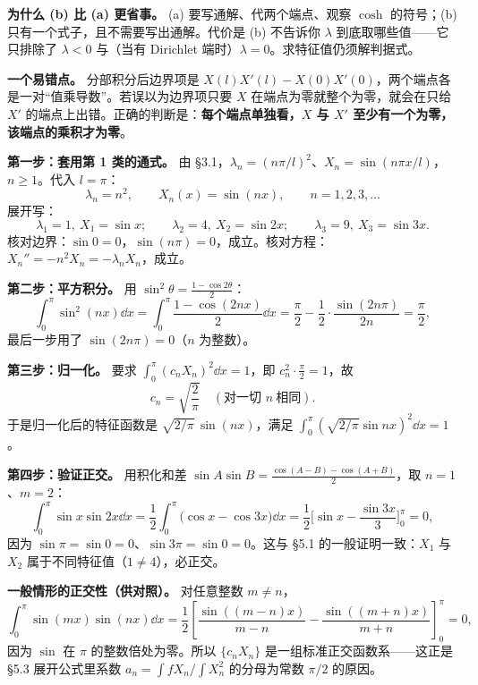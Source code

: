 \documentclass[11pt]{ctexart}
\begin{document}
\textbf{为什么 (b) 比 (a) 更省事。} (a) 要写通解、代两个端点、观察 $\cosh$ 的符号；(b) 只有一个式子，且不需要写出通解。代价是 (b) 不告诉你 $\lambda$ 到底取哪些值——它只排除了 $\lambda<0$ 与（当有 Dirichlet 端时）$\lambda=0$。求特征值仍须解判据式。

\textbf{一个易错点。} 分部积分后边界项是 $X(l)X'(l)-X(0)X'(0)$，两个端点各是一对“值乘导数”。若误以为边界项只要 $X$ 在端点为零就整个为零，就会在只给 $X'$ 的端点上出错。正确的判断是：\textbf{每个端点单独看，$X$ 与 $X'$ 至少有一个为零，该端点的乘积才为零}。



\textbf{第一步：套用第 1 类的通式。} 由 §3.1，$\lambda_n=(n\pi/l)^2$、$X_n=\sin(n\pi x/l)$，$n\ge1$。代入 $l=\pi$：
\[
\lambda_n=n^2,\qquad X_n(x)=\sin(nx),\qquad n=1,2,3,\dots
\]
展开写：
\[
\lambda_1=1,\ X_1=\sin x;\qquad
\lambda_2=4,\ X_2=\sin2x;\qquad
\lambda_3=9,\ X_3=\sin3x .
\]
核对边界：$\sin0=0$，$\sin(n\pi)=0$，成立。核对方程：$X_n''=-n^2X_n=-\lambda_nX_n$，成立。

\textbf{第二步：平方积分。} 用 $\sin^2\theta=\frac{1-\cos2\theta}{2}$：
\[
\int_0^\pi\sin^2(nx)\dd x=\int_0^\pi\frac{1-\cos(2nx)}{2}\dd x=\frac{\pi}{2}-\frac{1}{2}\cdot\frac{\sin(2n\pi)}{2n}=\frac{\pi}{2},
\]
最后一步用了 $\sin(2n\pi)=0$（$n$ 为整数）。

\textbf{第三步：归一化。} 要求 $\int_0^\pi(c_nX_n)^2\dd x=1$，即 $c_n^2\cdot\frac{\pi}{2}=1$，故
\[
c_n=\sqrt{\frac{2}{\pi}}\quad(\text{对一切 }n\ \text{相同}).
\]
于是归一化后的特征函数是 $\sqrt{2/\pi}\,\sin(nx)$，满足 $\int_0^\pi\left(\sqrt{2/\pi}\sin nx\right)^2\dd x=1$。

\textbf{第四步：验证正交。} 用积化和差 $\sin A\sin B=\frac{\cos(A-B)-\cos(A+B)}{2}$，取 $n=1$、$m=2$：
\[
\int_0^\pi\sin x\sin2x\dd x
=\frac12\int_0^\pi\big(\cos x-\cos3x\big)\dd x
=\frac12\Big[\sin x-\frac{\sin3x}{3}\Big]_0^\pi=0,
\]
因为 $\sin\pi=\sin0=0$、$\sin3\pi=\sin0=0$。这与 §5.1 的一般证明一致：$X_1$ 与 $X_2$ 属于不同特征值（$1\ne4$），必正交。


\textbf{一般情形的正交性（供对照）。} 对任意整数 $m\ne n$，
\[
\int_0^\pi\sin(mx)\sin(nx)\dd x
=\frac12\left[\frac{\sin((m-n)x)}{m-n}-\frac{\sin((m+n)x)}{m+n}\right]_0^\pi=0,
\]
因为 $\sin$ 在 $\pi$ 的整数倍处为零。所以 $\{c_nX_n\}$ 是一组标准正交函数系——这正是 §5.3 展开公式里系数 $a_n=\int fX_n/\int X_n^2$ 的分母为常数 $\pi/2$ 的原因。
\end{document}
